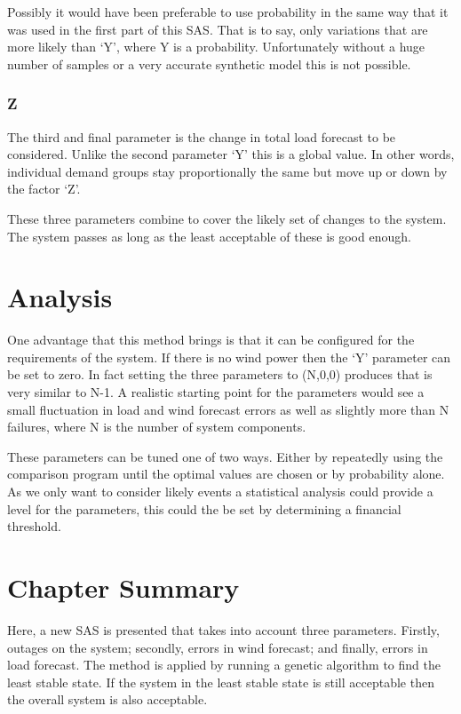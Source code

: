 \documentclass[a4paper,oneside,12pt]{report}
\begin{document}
Possibly it would have been preferable to use probability in the same way that it was used in the first part of this SAS. That is to say, only variations that are more likely than `Y', where Y is a probability. Unfortunately without a huge number of samples or a very accurate synthetic model this is not possible.

\subsubsection{Z}

The third and final parameter is the change in total load forecast to be considered. Unlike the second parameter `Y' this is a global value. In other words, individual demand groups stay proportionally the same but move up or down by the factor `Z'.

These three parameters combine to cover the likely set of changes to the system. The system passes as long as the least acceptable of these is good enough.

\section{Analysis}

One advantage that this method brings is that it can be configured for the requirements of the system. If there is no wind power then the `Y' parameter can be set to zero. In fact setting the three parameters to (N,0,0) produces that is very similar to N-1. A realistic starting point for the parameters would see a small fluctuation in load and wind forecast errors as well as slightly more than N failures, where N is the number of system components.

These parameters can be tuned one of two ways. Either by repeatedly using the comparison program until the optimal values are chosen or by probability alone. As we only want to consider likely events a statistical analysis could provide a level for the parameters, this could the be set by determining a financial threshold.


\section{Chapter Summary}

Here, a new SAS is presented that takes into account three parameters. Firstly, outages on the system; secondly, errors in wind forecast; and finally, errors in load forecast. The method is applied by running a genetic algorithm to find the least stable state. If the system in the least stable state is still acceptable then the overall system is also acceptable.
\end{document}
